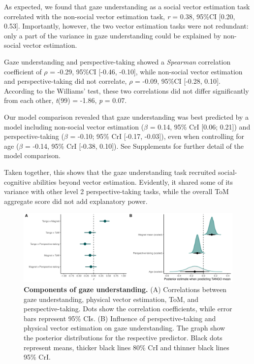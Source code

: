 \documentclass[
  man,floatsintext]{apa6}
\begin{document}
As expected, we found that gaze understanding as a social vector estimation task correlated with the non-social vector estimation task, \emph{r} = 0.38, 95\%CI {[}0.20, 0.53{]}.
Importantly, however, the two vector estimation tasks were not redundant: only a part of the variance in gaze understanding could be explained by non-social vector estimation.

Gaze understanding and perspective-taking showed a \emph{Spearman} correlation coefficient of \(\rho\) = -0.29, 95\%CI {[}-0.46, -0.10{]}, while non-social vector estimation and perspective-taking did not correlate, \(\rho\) = -0.09, 95\%CI {[}-0.28, 0.10{]}.
According to the Williams' test, these two correlations did not differ significantly from each other, \emph{t}(99) = -1.86, \emph{p} = 0.07.

Our model comparison revealed that gaze understanding was best predicted by a model including non-social vector estimation (\(\beta\) = 0.14, 95\% CrI {[}0.06; 0.21{]}) and perspective-taking (\(\beta\) = -0.10; 95\% CrI {[}-0.17, -0.03{]}), even when controlling for age (\(\beta\) = -0.14, 95\% CrI {[}-0.38, 0.10{]}).
See Supplements for further detail of the model comparison.

Taken together, this shows that the gaze understanding task recruited social-cognitive abilities beyond vector estimation.
Evidently, it shared some of its variance with other level 2 perspective-taking tasks, while the overall ToM aggregate score did not add explanatory power.



\begin{figure}

{\centering \includegraphics[width=1\linewidth]{../figures/magnet_arrangedplot} 

}

\caption{\textbf{Components of gaze understanding.} (A) Correlations between gaze understanding, physical vector estimation, ToM, and perspective-taking. Dots show the correlation coefficients, while error bars represent 95\% CIs. (B) Influence of perspective-taking and physical vector estimation on gaze understanding. The graph show the posterior distributions for the respective predictor. Black dots represent means, thicker black lines 80\% CrI and thinner black lines 95\% CrI.}\label{fig:fig4}
\end{figure}
\end{document}
